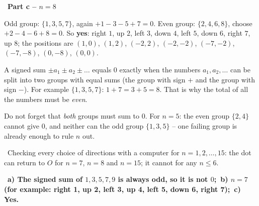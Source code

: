 \documentclass[11pt]{article}
\providecommand{\AnsWord}{Đáp số}
\newcommand{\ans}[1]{\par\smallskip{\bfseries\color{tmGreen!88!black}\AnsWord:}\ {\bfseries\color{AnsRed}#1}\par}
\newcommand{\step}[2]{\par\smallskip\noindent{\bfseries\color{tmBlue!85!black}\StepWord~#1.}\ {\bfseries #2}\par\nopagebreak}
\newcommand{\verify}[1]{\par\smallskip\noindent{\bfseries\color{tmGreen!80!black}\faCheckCircle\ \CheckWord}\ #1\par}
\def\AnsWord{Answer}
\def\StepWord{Step}
\def\CheckWord{Check:}
\begin{document}
{\step{4}{Part c -- $n=8$}
Odd group: $\{1,3,5,7\}$, again $+1-3-5+7=0$. Even group: $\{2,4,6,8\}$, choose $+2-4-6+8=0$. So \textbf{yes}: right $1$, up $2$, left $3$, down $4$, left $5$, down $6$, right $7$, up $8$; the positions are $(1,0)$, $(1,2)$, $(-2,2)$, $(-2,-2)$, $(-7,-2)$, $(-7,-8)$, $(0,-8)$, $(0,0)$.
\begin{proofbox}A signed sum $\pm a_1\pm a_2\pm\dots$ equals $0$ exactly when the numbers $a_1,a_2,\dots$ can be split into two groups with equal sums (the group with sign $+$ and the group with sign $-$). For example $\{1,3,5,7\}$: $1+7=3+5=8$. That is why the total of all the numbers must be \emph{even}.\end{proofbox}
\begin{warnbox}Do not forget that \emph{both} groups must sum to $0$. For $n=5$: the even group $\{2,4\}$ cannot give $0$, and neither can the odd group $\{1,3,5\}$ -- one failing group is already enough to rule $n$ out.\end{warnbox}
\verify{Checking every choice of directions with a computer for $n=1,2,\dots,15$: the dot can return to $O$ for $n=7$, $n=8$ and $n=15$; it cannot for any $n\le 6$.}
\ans{a) The signed sum of $1,3,5,7,9$ is always odd, so it is not $0$;\ b) $n=7$ (for example: right 1, up 2, left 3, up 4, left 5, down 6, right 7);\ c) Yes.}
}
\end{document}
